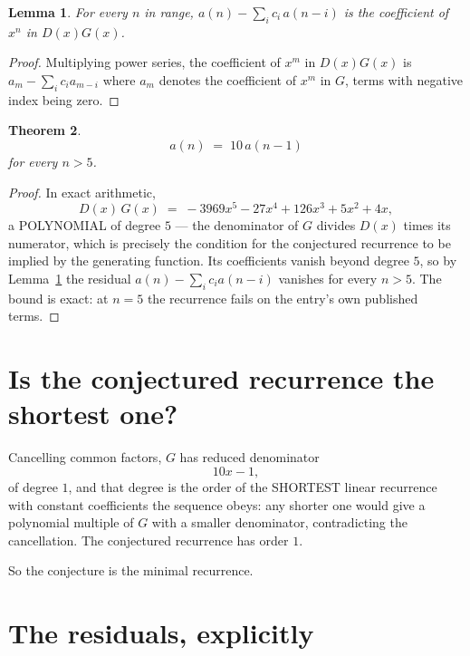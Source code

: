 \documentclass[11pt,a4paper]{article}
\theoremstyle{plain}
\newtheorem{theorem}{Theorem}
\newtheorem{lemma}[theorem]{Lemma}
\theoremstyle{definition}
\begin{document}
\begin{lemma}\label{lem:key}
For every $n$ in range, $a(n)-\sum_i c_i\,a(n-i)$ is the coefficient of $x^{n}$ in
$D(x)G(x)$.
\end{lemma}

\begin{proof}
Multiplying power series, the coefficient of $x^{m}$ in $D(x)G(x)$ is
$a_m-\sum_i c_i a_{m-i}$ where $a_m$ denotes the coefficient of $x^{m}$ in $G$, terms with
negative index being zero.
\end{proof}

\begin{theorem}
\[
a(n)\;=\;10\,a(n-1)
\]
for every $n>5$.
\end{theorem}

\begin{proof}
In exact arithmetic,
\[
D(x)\,G(x)\;=\;- 3969 x^{5} - 27 x^{4} + 126 x^{3} + 5 x^{2} + 4 x,
\]
a POLYNOMIAL of degree $5$ --- the denominator of $G$ divides $D(x)$ times its numerator,
which is precisely the condition for the conjectured recurrence to be implied by the
generating function. Its coefficients vanish beyond degree $5$, so by
Lemma~\ref{lem:key} the residual $a(n)-\sum_ic_ia(n-i)$ vanishes for every
$n>5$. The bound is exact: at $n=5$ the recurrence fails on the entry's own published terms.
\end{proof}

\section{Is the conjectured recurrence the shortest one?}

Cancelling common factors, $G$ has reduced denominator
\[
10 x - 1,
\]
of degree $1$, and that degree is the order of the SHORTEST linear recurrence with
constant coefficients the sequence obeys: any shorter one would give a polynomial multiple of
$G$ with a smaller denominator, contradicting the cancellation. The conjectured recurrence has
order $1$.

So the conjecture is the minimal recurrence.

\section{The residuals, explicitly}
\end{document}
